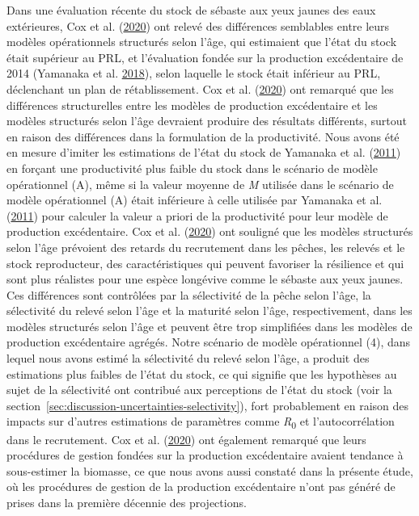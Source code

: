 \documentclass[11pt]{book}
\begin{document}
Dans une évaluation récente du stock de sébaste aux yeux jaunes des eaux extérieures, Cox et al. (\protect\hyperlink{ref-cox2020}{2020}) ont relevé des différences semblables entre leurs modèles opérationnels structurés selon l'âge, qui estimaient que l'état du stock était supérieur au PRL, et l'évaluation fondée sur la production excédentaire de 2014 (Yamanaka et al. \protect\hyperlink{ref-yamanaka2018yelloweyeoutside}{2018}), selon laquelle le stock était inférieur au PRL, déclenchant un plan de rétablissement. Cox et al. (\protect\hyperlink{ref-cox2020}{2020}) ont remarqué que les différences structurelles entre les modèles de production excédentaire et les modèles structurés selon l'âge devraient produire des résultats différents, surtout en raison des différences dans la formulation de la productivité. Nous avons été en mesure d'imiter les estimations de l'état du stock de Yamanaka et al. (\protect\hyperlink{ref-yamanaka2011}{2011}) en forçant une productivité plus faible du stock dans le scénario de modèle opérationnel (A), même si la valeur moyenne de \emph{M} utilisée dans le scénario de modèle opérationnel (A) était inférieure à celle utilisée par Yamanaka et al. (\protect\hyperlink{ref-yamanaka2011}{2011}) pour calculer la valeur a priori de la productivité pour leur modèle de production excédentaire. Cox et al. (\protect\hyperlink{ref-cox2020}{2020}) ont souligné que les modèles structurés selon l'âge prévoient des retards du recrutement dans les pêches, les relevés et le stock reproducteur, des caractéristiques qui peuvent favoriser la résilience et qui sont plus réalistes pour une espèce longévive comme le sébaste aux yeux jaunes. Ces différences sont contrôlées par la sélectivité de la pêche selon l'âge, la sélectivité du relevé selon l'âge et la maturité selon l'âge, respectivement, dans les modèles structurés selon l'âge et peuvent être trop simplifiées dans les modèles de production excédentaire agrégés. Notre scénario de modèle opérationnel (4), dans lequel nous avons estimé la sélectivité du relevé selon l'âge, a produit des estimations plus faibles de l'état du stock, ce qui signifie que les hypothèses au sujet de la sélectivité ont contribué aux perceptions de l'état du stock (voir la section~\ref{sec:discussion-uncertainties-selectivity}), fort probablement en raison des impacts sur d'autres estimations de paramètres comme \emph{R}\textsubscript{0} et l'autocorrélation dans le recrutement. Cox et al. (\protect\hyperlink{ref-cox2020}{2020}) ont également remarqué que leurs procédures de gestion fondées sur la production excédentaire avaient tendance à sous-estimer la biomasse, ce que nous avons aussi constaté dans la présente étude, où les procédures de gestion de la production excédentaire n'ont pas généré de prises dans la première décennie des projections.
\end{document}

